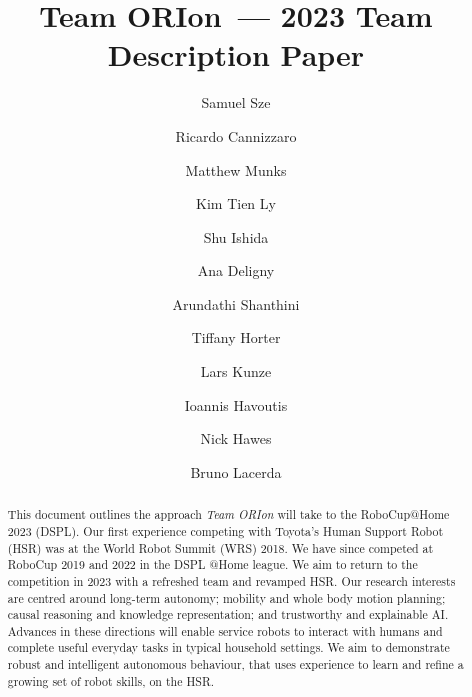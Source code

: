 \documentclass[runningheads,a4paper]{llncs}
\newcommand{\teamori}{Team ORIon}
\begin{document}

\title{\teamori\ --- 2023 Team Description Paper}

\author{Samuel Sze \and Ricardo Cannizzaro \and Matthew Munks \and Kim Tien Ly \and Shu Ishida \and Ana Deligny \and Arundathi Shanthini \and Tiffany Horter \and Lars Kunze \and Ioannis Havoutis \and Nick Hawes \and Bruno Lacerda}

\maketitle


\begin{abstract}
This document outlines the approach \textit{\teamori} will take to the RoboCup@Home 2023 (DSPL).
Our first experience competing with Toyota's Human Support Robot (HSR) was at the World Robot Summit (WRS) 2018. We have since competed at RoboCup 2019 and 2022 in the DSPL @Home league. We aim to return to the competition in 2023 with a refreshed team and revamped HSR. 
Our research interests are centred around long-term autonomy; mobility and whole body motion planning; causal reasoning and knowledge representation; and trustworthy and explainable AI.
Advances in these directions will enable service robots to interact with humans and complete useful everyday tasks in typical household settings. 
We aim to demonstrate robust and intelligent autonomous behaviour, that uses experience to learn and refine a growing set of robot skills, on the HSR.
\end{abstract}



\end{document}
